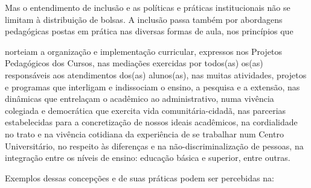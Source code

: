 \documentclass[a4paper, 12pt, openright, oneside, german, french, english, brazil]{abntex2}
\begin{document}
Mas o entendimento de inclusão e as políticas e práticas institucionais não se limitam à distribuição de bolsas. A inclusão passa também por abordagens pedagógicas postas em prática nas diversas formas de aula, nos princípios que

norteiam a organização e implementação curricular, expressos nos Projetos Pedagógicos dos Cursos, nas mediações exercidas por todos(as) os(as) responsáveis aos atendimentos dos(as) alunos(as), nas muitas atividades, projetos e programas que interligam e indissociam o ensino, a pesquisa e a extensão, nas dinâmicas que entrelaçam o acadêmico ao administrativo, numa vivência colegiada e democrática que exercita vida comunitária-cidadã, nas parcerias estabelecidas para a concretização de nossos ideais acadêmicos, na cordialidade no trato e na vivência cotidiana da experiência de se trabalhar num Centro Universitário, no respeito às diferenças e na não-discriminalização de pessoas, na integração entre os níveis de ensino: educação básica e superior, entre outras.

Exemplos dessas concepções e de suas práticas podem ser percebidas na:
\end{document}
